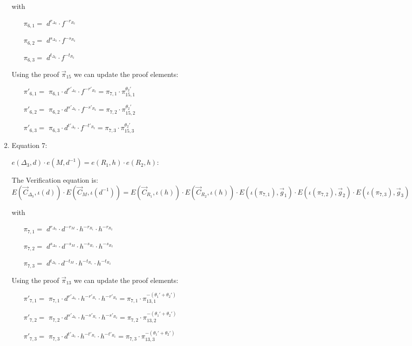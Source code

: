 \begin{description}
\begin{enumerate}
\begin{enumerate}
      with
      \begin{itemize}
      \item[$\pi_{6,1} = $] $d^{r_{\Delta_2}} \cdot f^{-r_{R_2}}$
      \item[$\pi_{6,2} = $] $d^{s_{\Delta_2}} \cdot f^{-s_{R_2}}$
      \item[$\pi_{6,3} = $] $d^{t_{\Delta_2}} \cdot f^{-t_{R_2}}$
      \end{itemize}

      Using the proof $\vec{\pi}_{15}$ we can update the proof elements:
      \begin{itemize}
      \item[$\pi'_{6,1} = $] $\pi_{6,1} \cdot d^{r'_{\Delta_2}} \cdot f^{-r'_{R_2}} = \pi_{7,1} \cdot \pi_{15,1}^{\theta_2'}$
      \item[$\pi'_{6,2} = $] $\pi_{6,2} \cdot d^{s'_{\Delta_2}} \cdot f^{-s'_{R_2}} = \pi_{7,2} \cdot \pi_{15,2}^{\theta_2'}$
      \item[$\pi'_{6,3} = $] $\pi_{6,3} \cdot d^{t'_{\Delta_2}} \cdot f^{-t'_{R_2}} = \pi_{7,3} \cdot \pi_{15,3}^{\theta_2'}$
      \end{itemize}
      
    \item Equation 7:

      $e(\boxed{\Delta_3},d) \cdot e(\boxed{M}, d^{-1})= e(\boxed{R_1}, h) \cdot e(\boxed{R_2}, h)$:
      
      The Verification equation is:  $E(\vec{C}_{\Delta_3}, \iota(d)) \cdot E(\vec{C}_M, \iota(d^{-1}))= E(\vec{C}_{R_1}, \iota(h)) \cdot E(\vec{C}_{R_2}, \iota(h)) \cdot E(\iota(\pi_{7,1}), \vec{g}_1)\cdot E(\iota(\pi_{7,2}), \vec{g}_2)\cdot E(\iota(\pi_{7,3}), \vec{g}_3)$
      
      with
      \begin{itemize}
      \item[$\pi_{7,1} = $] $d^{r_{\Delta_3}} \cdot d^{-r_M} \cdot h^{-r_{R_1}} \cdot h^{-r_{R_2}}$
      \item[$\pi_{7,2} = $] $d^{s_{\Delta_3}} \cdot d^{-s_M} \cdot h^{-s_{R_1}} \cdot h^{-s_{R_2}}$
      \item[$\pi_{7,3} = $] $d^{t_{\Delta_3}} \cdot d^{-t_M} \cdot h^{-t_{R_1}} \cdot h^{-t_{R_2}}$
      \end{itemize}   

      Using the proof $\vec{\pi}_{13}$ we can update the proof elements:
      \begin{itemize}
      \item[$\pi'_{7,1} = $] $\pi_{7,1} \cdot d^{r'_{\Delta_3}} \cdot h^{-r'_{R_1}} \cdot h^{-r'_{R_2}} = \pi_{7,1} \cdot \pi_{13,1}^{-(\theta_1'+\theta_2')}$
      \item[$\pi'_{7,2} = $] $\pi_{7,2} \cdot d^{s'_{\Delta_3}} \cdot h^{-s'_{R_1}} \cdot h^{-s'_{R_2}} = \pi_{7,2} \cdot \pi_{13,2}^{-(\theta_1'+\theta_2')}$
      \item[$\pi'_{7,3} = $] $\pi_{7,3} \cdot d^{t'_{\Delta_3}} \cdot h^{-t'_{R_1}} \cdot h^{-t'_{R_2}} = \pi_{7,3} \cdot \pi_{13,3}^{-(\theta_1'+\theta_2')}$
      \end{itemize}


\end{enumerate}
\end{enumerate}
\end{description}
